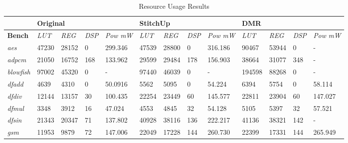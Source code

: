 \begin{table}[t]
\small
\singlespace
\centering
\caption{Resource Usage Results}
\label{tab:resources}
\tabcolsep=0.11cm
\begin{tabular}{@{}|l|l|l|l|l|l|l|l|l|l|l|l|l|@{}}
\toprule
                    & \multicolumn{4}{l|}{\textbf{Original}}                      & \multicolumn{4}{l|}{\textbf{StitchUp}}                      & \multicolumn{4}{l|}{\textbf{DMR}}                           \\ \midrule
\textbf{Bench}      & \textit{LUT} & \textit{REG} & \textit{DSP} &\textit{Pow mW} & \textit{LUT} & \textit{REG} & \textit{DSP} &\textit{Pow mW}& \textit{LUT} & \textit{REG} & \textit{DSP} & \textit{Pow mW}   \\ \midrule
\textit{aes}        & 47230        & 28152        & 0            & 299.346        & 47539        & 28800        & 0            & 316.186        & 90467        & 53944        & 0            & -              \\ \midrule
\textit{adpcm}      & 21050        & 16752        & 168          & 133.962        & 29599        & 29484        & 178          & 156.903        & 38664        & 31077        & 348          & -              \\ \midrule
\textit{blowfish}   & 97002        & 45320        & 0            & -              & 97440        & 46039        & 0            & -              & 194598       & 88268        & 0            & -              \\ \midrule
\textit{dfadd}      & 4639         & 4310         & 0            & 50.0916        & 5562         & 5095         & 0            & 54.224         & 6394         & 5754         & 0            & 58.114         \\ \midrule
\textit{dfdiv}      & 12144        & 13157        & 30           & 100.435        & 22254        & 23449        & 60           & 145.577        & 22811        & 23904        & 60           & 147.027        \\ \midrule
\textit{dfmul}      & 3348         & 3912         & 16           & 47.024         & 4553         & 4845         & 32           & 54.128         & 5105         & 5397         & 32           & 57.521         \\ \midrule
\textit{dfsin}      & 21343        & 20347        & 71           & 137.802        & 40928        & 38116        & 136          & 222.217        & 41136        & 38321        & 142          & -              \\ \midrule
\textit{gsm}        & 11953        & 9879         & 72           & 147.006        & 22049        & 17228        & 144          & 260.730        & 22399        & 17331        & 144          & 265.949        \\ \midrule

\end{tabular}
\end{table}
